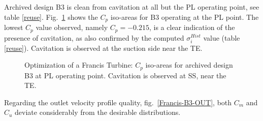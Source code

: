 \FloatBarrier
Archived design B3 is clean from cavitation at all but the PL operating point, see table \ref{reuse}. Fig.\ \ref{Francis-B3-PL} shows the $C_p$ iso-areas for  B3 operating at the PL point. The lowest $C_p$ value observed, namely $C_p= -0.215$, is a clear indication of the presence of cavitation, as also confirmed by the computed $\sigma_i^{Hist}$ value (table \ref{reuse}). Cavitation is observed at the suction side near the TE.     


\begin{figure}[h!]
\begin{minipage}[b]{1\linewidth}
 \centering
\end{minipage}
\caption{Optimization of a Francis Turbine: $C_p$ iso-areas for archived design B3 at PL operating point. Cavitation is observed at SS, near the TE.}
\label{Francis-B3-PL}
\end{figure}

Regarding the outlet velocity profile quality, fig.\ \ref{Francis-B3-OUT}, both $C_m$  and $C_u$ deviate considerably from the desirable distributions.   

